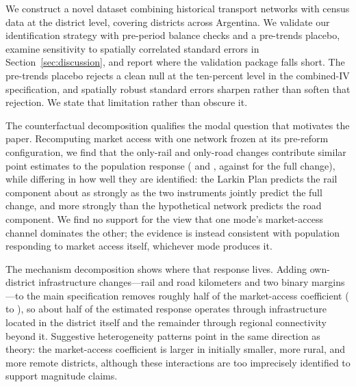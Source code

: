We construct a novel dataset combining historical transport networks
with census data at the district level, covering \nDistricts{}
districts across Argentina. We validate our identification strategy
with pre-period balance checks and a pre-trends placebo, examine
sensitivity to spatially correlated standard errors in
Section~\ref{sec:discussion}, and report where the validation
package falls short. The pre-trends placebo rejects a clean null at
the ten-percent level in the combined-IV specification, and spatially
robust standard errors sharpen rather than soften that rejection. We
state that limitation rather than obscure it.


The counterfactual decomposition qualifies the modal question that
motivates the paper. Recomputing market access with one network frozen
at its pre-reform configuration, we find that the only-rail and
only-road changes contribute similar point estimates to the population
response (\cfRailCoefIVPop{} and \cfRoadCoefIVPop{}, against
\mainPopCoefIVBoth{} for the full change), while
differing in how well they are identified: the Larkin Plan predicts the
rail component about as strongly as the two instruments jointly predict
the full change, and more strongly than the hypothetical network
predicts the road component. We find no
support
for the view that one mode's market-access channel dominates the
other; the evidence is instead consistent with population responding
to market access itself, whichever mode produces it.

The mechanism decomposition shows where that response lives. Adding
own-district infrastructure changes—rail and road kilometers and
two binary margins—to the main specification removes roughly half
of the market-access coefficient (\mainPopCoefIVBoth{} to
\mechAllZCoef{}), so about half of
the estimated response operates through infrastructure located in the
district itself and the remainder through regional connectivity
beyond it. Suggestive heterogeneity patterns point in the same
direction as theory: the market-access coefficient is larger in
initially smaller, more rural, and more remote districts, although
these interactions are too imprecisely identified to support
magnitude claims.

